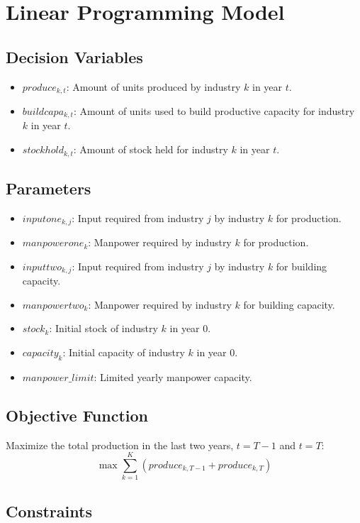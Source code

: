 \documentclass{article}
\begin{document}
\section*{Linear Programming Model}

\subsection*{Decision Variables}
\begin{itemize}
    \item $produce_{k, t}$: Amount of units produced by industry $k$ in year $t$.
    \item $buildcapa_{k, t}$: Amount of units used to build productive capacity for industry $k$ in year $t$.
    \item $stockhold_{k, t}$: Amount of stock held for industry $k$ in year $t$.
\end{itemize}

\subsection*{Parameters}
\begin{itemize}
    \item $inputone_{k, j}$: Input required from industry $j$ by industry $k$ for production.
    \item $manpowerone_{k}$: Manpower required by industry $k$ for production.
    \item $inputtwo_{k, j}$: Input required from industry $j$ by industry $k$ for building capacity.
    \item $manpowertwo_{k}$: Manpower required by industry $k$ for building capacity.
    \item $stock_{k}$: Initial stock of industry $k$ in year 0.
    \item $capacity_{k}$: Initial capacity of industry $k$ in year 0.
    \item $manpower\_limit$: Limited yearly manpower capacity.
\end{itemize}

\subsection*{Objective Function}
Maximize the total production in the last two years, $t = T-1$ and $t = T$:
\[
\max \sum_{k=1}^{K} (produce_{k, T-1} + produce_{k, T})
\]

\subsection*{Constraints}
\end{document}
